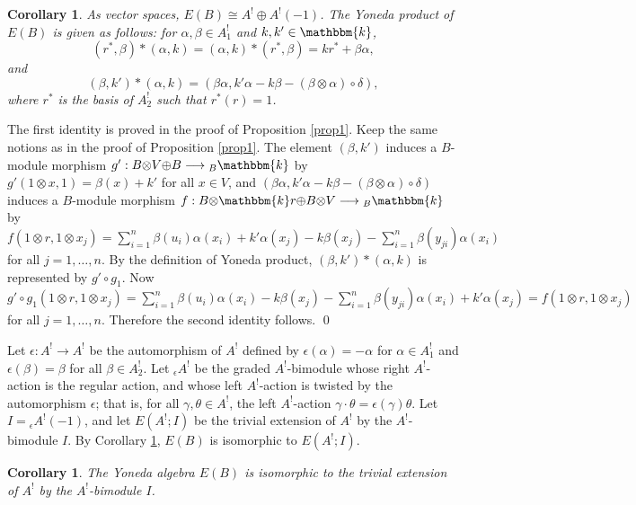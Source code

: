 \documentclass[a4paper]{amsart}
\newtheorem{cor}[thm]{Corollary}
\begin{document}
\begin{cor} \label{cor1} As vector spaces, $E(B)\cong A^!{\oplus} A^!(-1)$. The Yoneda product of $E(B)$ is given as follows: for $\alpha,\beta\in A^!_1$ and $k,k'\in{\mathbbm{k}}$, $$(r^*,\beta)*(\alpha,k)=(\alpha,k)*(r^*,\beta)=kr^*+\beta\alpha,$$ and $$(\beta,k')*(\alpha,k)=(\beta\alpha,k'\alpha-k\beta-(\beta{\otimes}\alpha)\circ\delta),$$ where $r^*$ is the basis of $A^!_2$ such that $r^*(r)=1$.
\end{cor}
\proof The first identity is proved in the proof of Proposition \ref{prop1}. Keep the same notions as in the proof of Proposition \ref{prop1}. The element $(\beta,k')$ induces a $B$-module morphism $g':B{\otimes} V{\oplus} B\longrightarrow {}_B{\mathbbm{k}}$ by $g'(1{\otimes} x,1)=\beta(x)+k'$ for all $x\in V$, and $(\beta\alpha,k'\alpha-k\beta-(\beta{\otimes}\alpha)\circ\delta)$ induces a $B$-module morphism $f:B{\otimes} {\mathbbm{k}} r{\oplus} B{\otimes} V\longrightarrow {}_B{\mathbbm{k}}$ by $f(1{\otimes} r,1{\otimes} x_j)=\sum_{i=1}^n\beta(u_i)\alpha(x_i)+k'\alpha(x_j)-k\beta(x_j)-\sum_{i=1}^n\beta(y_{ji})\alpha(x_i)$ for all $j=1,\dots,n$. By the definition of Yoneda product, $(\beta,k')*(\alpha,k)$ is represented by $g'\circ g_1$. Now $g'\circ g_1(1{\otimes} r,1{\otimes} x_j)=\sum_{i=1}^n\beta(u_i)\alpha(x_i)-k\beta(x_j)-\sum_{i=1}^n\beta(y_{ji})\alpha(x_i)+k'\alpha(x_j)=f(1{\otimes} r,1{\otimes} x_j)$ for all $j=1,\dots,n$. Therefore the second identity follows. \qed

Let $\epsilon:A^!\to A^!$ be the automorphism of $A^!$ defined by $\epsilon(\alpha)=-\alpha$ for $\alpha\in A^!_1$ and $\epsilon(\beta)=\beta$ for all $\beta\in A^!_2$. Let ${}_\epsilon A^!$ be the graded $A^!$-bimodule whose right $A^!$-action is the regular action, and whose left $A^!$-action is twisted by the automorphism $\epsilon$; that is, for all $\gamma,\theta\in A^!$, the left $A^!$-action $\gamma\cdot \theta=\epsilon(\gamma)\theta$. Let $I={}_\epsilon A^!(-1)$, and let $E(A^!;I)$ be the trivial extension of $A^!$ by the $A^!$-bimodule $I$. By Corollary \ref{cor1}, $E(B)$ is isomorphic to $E(A^!;I)$.

\begin{cor} \label{cor2} The Yoneda algebra $E(B)$ is isomorphic to the trivial extension of $A^!$ by the $A^!$-bimodule $I$.
\end{cor}
\end{document}
